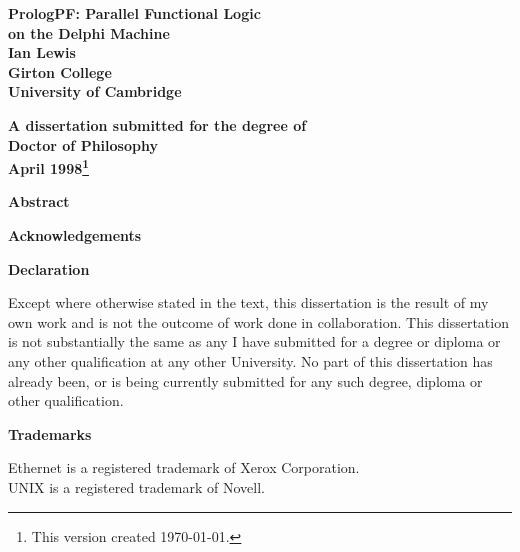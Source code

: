 \pagestyle{empty}


{  \begin{center}
\vspace*{\fill}
\LARGE\bf 
PrologPF: Parallel Functional Logic\\ on the Delphi Machine \\
\vfill
\vfill
\vfill
\Large
 \bf Ian Lewis\\[6mm]
Girton College\\
University of Cambridge\\
\vfill
\centerline{}
\vfill
\large \bf
A dissertation submitted for the degree of\\
Doctor of Philosophy\\[4mm]
April 1998\footnote{This version created \today.}\\
\vspace*{\fill}
\end{center}
}

\newpage
{\bf \Huge Abstract}

\vspace{12pt}





\parskip 10pt
\newpage
\pagestyle{plain}
\vfill 
\vfill
{\bf \Huge Acknowledgements}

\vspace{15pt}




\newpage
{\bf \Huge Declaration}

\vspace{10pt}
Except where otherwise stated in the text, this dissertation is the result of my own work and is not the outcome of work done in collaboration. This dissertation is not substantially the same as any I have submitted for a degree or diploma or any other qualification at any other University. No part of this dissertation has already been, or is being currently submitted for any such degree, diploma or other qualification.


\vspace{40pt}


{\bf \Huge Trademarks}

\vspace{10pt}
Ethernet is a registered trademark of Xerox Corporation. \\
UNIX is a registered trademark of Novell. \\


\newpage
\setcounter{tocdepth}{2}
\tableofcontents




\newpage
{}
\listoffigures


\vfill
\vfill
\vfill
\vfill

\newpage
{}
\listoftables


\newpage
{}

